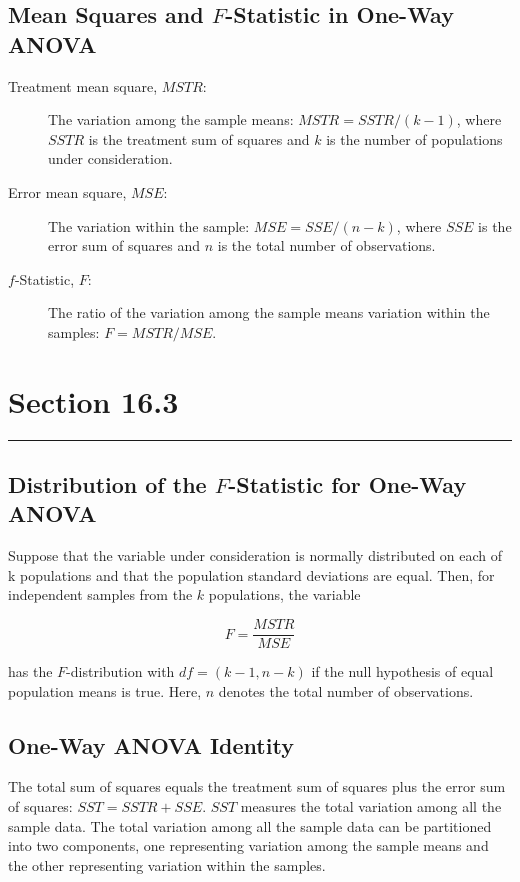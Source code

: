 \documentclass[12pt]{article}
\begin{document}
        \subsection*{Mean Squares and $F$-Statistic in One-Way ANOVA}
            \begin{description}
                \item[Treatment mean square, $MSTR$:] The variation among the sample means:
                $MSTR = SSTR/(k-1)$, where $SSTR$ is the treatment sum of squares and $k$ is
                the number of populations under consideration.
                \item[Error mean square, $MSE$:] The variation within the sample: $MSE = SSE/
                (n-k)$, where $SSE$ is the error sum of squares and $n$ is the total number
                of observations.
                \item[$f$-Statistic, $F$:] The ratio of the variation among the sample means
                variation within the samples: $F = MSTR/MSE$.  
            \end{description}

    \section*{Section 16.3}
    \noindent\rule{\textwidth}{0.4pt}
        \subsection*{Distribution of the $F$-Statistic for One-Way ANOVA}
            Suppose that the variable under consideration is normally distributed on each of
            k populations and that the population standard deviations are equal. Then, for
            independent samples from the $k$ populations, the variable
            \begin{center}
                \[
                    F = \frac{MSTR}{MSE}    
                \]
            \end{center}
            has the $F$-distribution with $df = (k-1, n-k)$ if the null hypothesis of equal
            population means is true. Here, $n$ denotes the total number of observations.
        \subsection*{One-Way ANOVA Identity}
            The total sum of squares equals the treatment sum of squares plus the error sum
            of squares: $SST = SSTR + SSE$. $SST$ measures the total variation among all the
            sample data. The total variation among all the sample data can be partitioned
            into two components, one representing variation among the sample means and the
            other representing variation within the samples.
\end{document}
